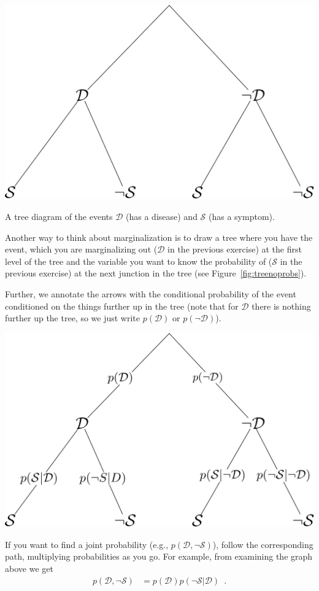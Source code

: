 \documentclass[assignment01_Solutions]{subfiles}
\begin{document}
\begin{marginfigure}
\includegraphics[width=\linewidth]{figures/treenoprobs}
\caption{A tree diagram of the events $\mathcal{D}$ (has a disease) and $\mathcal{S}$ (has a symptom).\label{fig:treenoprobs}}
\end{marginfigure}
Another way to think about marginalization is to draw a tree where you have the event, which you are marginalizing out ($\mathcal{D}$ in the previous exercise) at the first level of the tree and the variable you want to know the probability of ($\mathcal{S}$ in the previous exercise) at the next junction in the tree (see Figure~\ref{fig:treenoprobs}).


Further, we annotate the arrows with the conditional probability of the event conditioned on the things further up in the tree (note that for $\mathcal{D}$ there is nothing further up the tree, so we just write $p(\mathcal{D})$ or $p(\neg \mathcal{D})$).

\begin{center}
\includegraphics[width=0.6\linewidth]{figures/treeprobs}
\end{center}

If you want to find a joint probability (e.g., $p(\mathcal{D}, \neg \mathcal{S})$), follow the corresponding path, multiplying probabilities as you go.  For example, from examining the graph above we get
\begin{align}
p(\mathcal{D}, \neg \mathcal{S}) &= p(\mathcal{D}) p(\neg \mathcal{S}|\mathcal{D}) \enspace .
\end{align}
\end{document}
